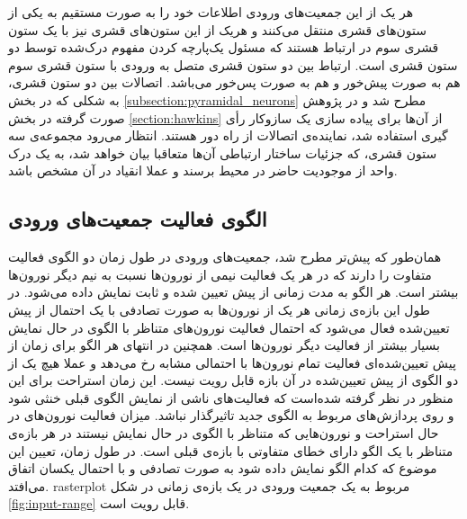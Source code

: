 \documentclass[12pt]{report}
\begin{document}
	هر یک از این جمعیت‌های ورودی اطلاعات خود‌ را به صورت مستقیم به یکی از ستون‌های قشری منتقل می‌کنند و هریک از این ستون‌های قشری نیز با یک ستون قشری سوم در ارتباط هستند که مسئول یک‌پارچه کردن مفهوم درک‌شده توسط دو ستون قشری است. ارتباط بین دو ستون قشری متصل به ورودی با ستون قشری سوم هم به صورت پیش‌خور و هم به صورت پس‌خور می‌باشد. 
	اتصالات بین دو ستون قشری، به شکلی که در بخش \ref{subsection:pyramidal_neurons} مطرح شد و در پژوهش صورت گرفته در بخش \ref{section:hawkins} از آن‌ها برای پیاده سازی یک سازوکار رأی گیری استفاده شد، نماینده‌ی اتصالات از راه دور هستند.
	انتظار می‌رود مجموعه‌ی سه ستون قشری، که جزئیات ساختار ارتباطی آن‌ها متعاقبا بیان خواهد شد، به یک درک واحد از موجودیت حاضر در محیط برسند و عملا انقیاد در آن مشخص باشد.
	
	
	\subsection{الگوی فعالیت جمعیت‌های ورودی}
	
	همان‌طور که پیش‌تر مطرح شد، جمعیت‌های ورودی در طول زمان دو الگوی فعالیت متفاوت را دارند که در هر‌ یک فعالیت نیمی از نورون‌ها نسبت به نیم دیگر نورون‌ها بیشتر است. هر الگو به مدت زمانی از پیش تعیین شده و ثابت نمایش داده می‌شود. در طول این بازه‌ی زمانی هر یک از نورون‌ها به صورت تصادفی با یک احتمال از پیش تعیین‌شده فعال می‌شود که احتمال فعالیت نورون‌های متناظر با الگوی در حال نمایش بسیار بیشتر از فعالیت دیگر نورون‌ها است. همچنین در انتهای هر الگو برای زمان از پیش تعیین‌شده‌ای فعالیت تمام نورون‌ها با احتمالی مشابه رخ می‌دهد  و عملا هیچ یک از دو الگوی از پیش تعیین‌شده در آن بازه قابل رویت نیست. این زمان استراحت برای این منظور در نظر گرفته شده‌است که فعالیت‌های ناشی از نمایش الگوی قبلی خنثی شود و روی پردازش‌های مربوط به الگوی جدید تاثیر‌گذار نباشد. میزان فعالیت نورون‌های در حال استراحت و نورون‌هایی که متناظر با الگوی در حال نمایش نیستند در هر بازه‌ی متناظر با یک الگو دارای خطای متفاوتی با بازه‌ی قبلی است.	
	در طول زمان، تعیین این موضوع که کدام الگو نمایش داده شود به صورت تصادفی و با احتمال یکسان اتفاق می‌افتد. \gls{rasterplot} مربوط به یک جمعیت ورودی در یک بازه‌ی زمانی در شکل \ref{fig:input-range} قابل رویت است.
	
\end{document}
